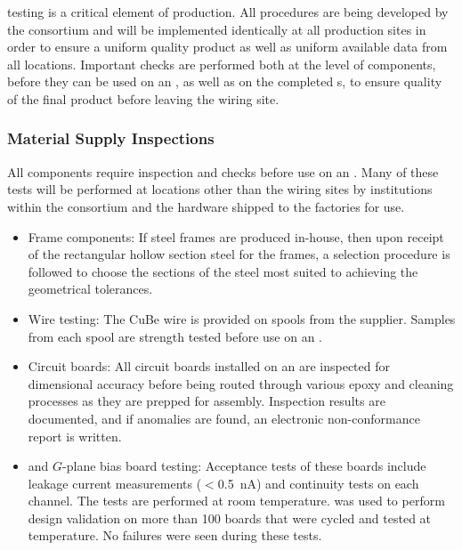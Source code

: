  testing is a critical element of  production.  All  procedures are being developed by the consortium and will be implemented identically at all production sites in order to ensure a uniform quality product as well as uniform available data from all locations.  Important  checks are performed both at the level of components, before they can be used on an , as well as on the completed s, to ensure quality of the final product before leaving the wiring site.

\subsubsection{Material Supply Inspections}

All components require inspection and  checks before use on an .  Many of these tests will be performed at locations other than the  wiring sites by institutions within the consortium and the hardware shipped to the factories for use. 

\begin{itemize}
\item Frame components: If  steel frames are produced in-house, then upon receipt of the rectangular hollow section steel for the frames, a selection procedure is followed to choose the sections of the steel most suited to achieving the geometrical tolerances. 
\item Wire testing: The CuBe wire is provided on spools from the supplier. Samples from each spool are strength tested before use on an .
\item Circuit boards: All circuit boards installed on an  are inspected for dimensional accuracy before being routed through various epoxy and cleaning processes as they are prepped for assembly. Inspection results are documented, and if anomalies are found, an electronic non-conformance report is written.  %
\item {} and $G$-plane bias board testing: Acceptance tests of these boards include leakage current measurements ($<$\SI{0.5}{nA}) and continuity tests on each channel.  The tests are performed at room temperature.  was used to perform design validation on more than \num{100} boards that were cycled and tested at \lntwo temperature. No failures were seen during these tests. 
\end{itemize}


